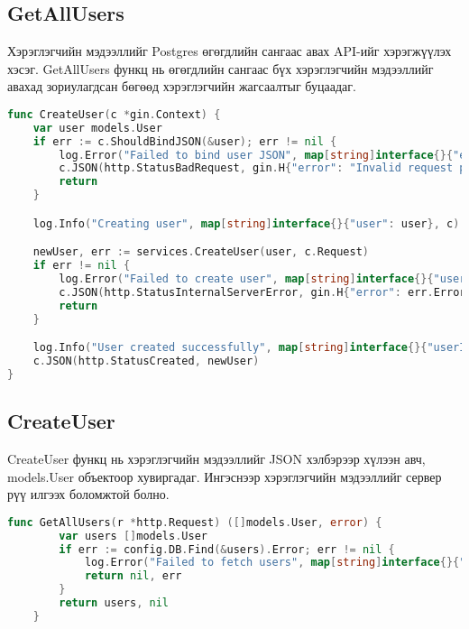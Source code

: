 \subsection{GetAllUsers}
Хэрэглэгчийн мэдээллийг Postgres өгөгдлийн сангаас авах API-ийг хэрэгжүүлэх хэсэг. GetAllUsers функц нь өгөгдлийн сангаас бүх хэрэглэгчийн мэдээллийг авахад зориулагдсан бөгөөд хэрэглэгчийн жагсаалтыг буцаадаг.

\begin{lstlisting}[language=Go, caption=CreateUser Controller, frame=single]
	func CreateUser(c *gin.Context) {
	var user models.User
	if err := c.ShouldBindJSON(&user); err != nil {
		log.Error("Failed to bind user JSON", map[string]interface{}{"error": err.Error()}, c)
		c.JSON(http.StatusBadRequest, gin.H{"error": "Invalid request payload"})
		return
	}

	log.Info("Creating user", map[string]interface{}{"user": user}, c)

	newUser, err := services.CreateUser(user, c.Request)
	if err != nil {
		log.Error("Failed to create user", map[string]interface{}{"user": user, "error": err.Error()}, c)
		c.JSON(http.StatusInternalServerError, gin.H{"error": err.Error()})
		return
	}

	log.Info("User created successfully", map[string]interface{}{"userID": newUser.ID}, c)
	c.JSON(http.StatusCreated, newUser)
}
\end{lstlisting}

\subsection{CreateUser}
CreateUser функц нь хэрэглэгчийн мэдээллийг JSON хэлбэрээр хүлээн авч, models.User объектоор хувиргадаг. Ингэснээр хэрэглэгчийн мэдээллийг сервер рүү илгээх боломжтой болно.
\begin{lstlisting}[language=Go, caption=CreatUser Controller, frame=single]
	func GetAllUsers(r *http.Request) ([]models.User, error) {
		var users []models.User
		if err := config.DB.Find(&users).Error; err != nil {
			log.Error("Failed to fetch users", map[string]interface{}{"error": err.Error()}, r)
			return nil, err
		}
		return users, nil
	}
\end{lstlisting}

